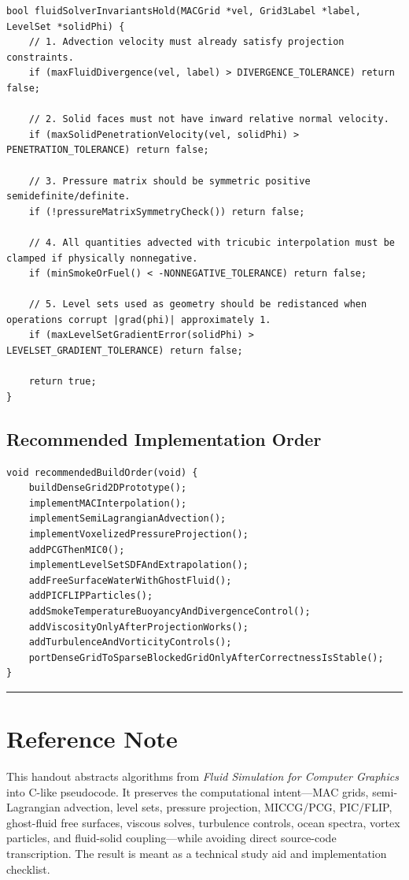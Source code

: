 \documentclass[10pt,letterpaper]{article}
\begin{document}
\begin{verbatim}
bool fluidSolverInvariantsHold(MACGrid *vel, Grid3Label *label, LevelSet *solidPhi) {
    // 1. Advection velocity must already satisfy projection constraints.
    if (maxFluidDivergence(vel, label) > DIVERGENCE_TOLERANCE) return false;

    // 2. Solid faces must not have inward relative normal velocity.
    if (maxSolidPenetrationVelocity(vel, solidPhi) > PENETRATION_TOLERANCE) return false;

    // 3. Pressure matrix should be symmetric positive semidefinite/definite.
    if (!pressureMatrixSymmetryCheck()) return false;

    // 4. All quantities advected with tricubic interpolation must be clamped if physically nonnegative.
    if (minSmokeOrFuel() < -NONNEGATIVE_TOLERANCE) return false;

    // 5. Level sets used as geometry should be redistanced when operations corrupt |grad(phi)| approximately 1.
    if (maxLevelSetGradientError(solidPhi) > LEVELSET_GRADIENT_TOLERANCE) return false;

    return true;
}
\end{verbatim}

\subsection*{Recommended Implementation Order}

\begin{verbatim}
void recommendedBuildOrder(void) {
    buildDenseGrid2DPrototype();
    implementMACInterpolation();
    implementSemiLagrangianAdvection();
    implementVoxelizedPressureProjection();
    addPCGThenMIC0();
    implementLevelSetSDFAndExtrapolation();
    addFreeSurfaceWaterWithGhostFluid();
    addPICFLIPParticles();
    addSmokeTemperatureBuoyancyAndDivergenceControl();
    addViscosityOnlyAfterProjectionWorks();
    addTurbulenceAndVorticityControls();
    portDenseGridToSparseBlockedGridOnlyAfterCorrectnessIsStable();
}
\end{verbatim}

\medskip\hrule\medskip

\clearpage
{}
\section*{Reference Note}

This handout abstracts algorithms from \emph{Fluid Simulation for Computer Graphics} into C-like pseudocode. It preserves the computational intent---MAC grids, semi-Lagrangian advection, level sets, pressure projection, MICCG/PCG, PIC/FLIP, ghost-fluid free surfaces, viscous solves, turbulence controls, ocean spectra, vortex particles, and fluid-solid coupling---while avoiding direct source-code transcription. The result is meant as a technical study aid and implementation checklist.
\end{document}
